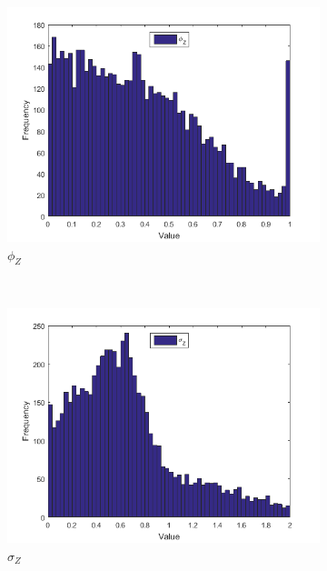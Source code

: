 \documentclass[11pt,a4,twosided,singlespacing,titlepagenumber=on]{scrreprt}
\numberwithin{equation}{chapter} %
\theoremstyle{remark}
\begin{document}
\begin{figure}[H]
\begin{subfigure}[t]{0.32\textwidth}
        \includegraphics[width=1\textwidth]{res/params/6575_7306/3}
        \caption{$\phi_Z$}
    \end{subfigure} \\
    \begin{subfigure}[t]{0.32\textwidth}
        \centering
        \includegraphics[width=1\textwidth]{res/params/6575_7306/4}
        \caption{$\sigma_Z$}
    \end{subfigure}
    \begin{subfigure}[t]{0.32\textwidth}
        \centering

\end{subfigure}
\end{figure}
\end{document}
